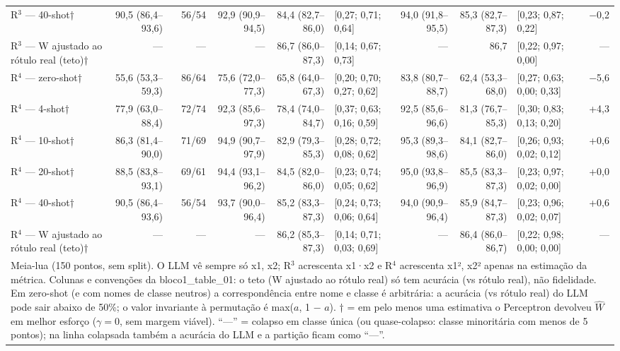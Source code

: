 \begin{table}[htbp]
\begin{tabular}{lrrrrlrrlr}
R$^3$ — 40-shot† & 90,5 (86,4–93,6) & 56/54 & 92,9 (90,9–94,5) & 84,4 (82,7–86,0) & [0,27; 0,71; 0,64] & 94,0 (91,8–95,5) & 85,3 (82,7–87,3) & [0,23; 0,87; 0,22] & $-$0,2 \\
R$^3$ — W ajustado ao rótulo real (teto)† & — & — & — & 86,7 (86,0–87,3) & [0,14; 0,67; 0,73] & — & 86,7 & [0,22; 0,97; 0,00] & — \\
\midrule
R$^4$ — zero-shot† & 55,6 (53,3–59,3) & 86/64 & 75,6 (72,0–77,3) & 65,8 (64,0–67,3) & [0,20; 0,70; 0,27; 0,62] & 83,8 (80,7–88,7) & 62,4 (53,3–68,0) & [0,27; 0,63; 0,00; 0,33] & $-$5,6 \\
R$^4$ — 4-shot† & 77,9 (63,0–88,4) & 72/74 & 92,3 (85,6–97,3) & 78,4 (74,0–84,7) & [0,37; 0,63; 0,16; 0,59] & 92,5 (85,6–96,6) & 81,3 (76,7–85,3) & [0,30; 0,83; 0,13; 0,20] & +4,3 \\
R$^4$ — 10-shot† & 86,3 (81,4–90,0) & 71/69 & 94,9 (90,7–97,9) & 82,9 (79,3–85,3) & [0,28; 0,72; 0,08; 0,62] & 95,3 (89,3–98,6) & 84,1 (82,7–86,0) & [0,26; 0,93; 0,02; 0,12] & +0,6 \\
R$^4$ — 20-shot† & 88,5 (83,8–93,1) & 69/61 & 94,4 (93,1–96,2) & 84,5 (82,0–86,0) & [0,23; 0,74; 0,05; 0,62] & 95,0 (93,8–96,9) & 85,5 (83,3–87,3) & [0,23; 0,97; 0,02; 0,00] & +0,0 \\
R$^4$ — 40-shot† & 90,5 (86,4–93,6) & 56/54 & 93,7 (90,0–96,4) & 85,2 (83,3–87,3) & [0,24; 0,73; 0,06; 0,64] & 94,0 (90,9–96,4) & 85,9 (84,7–87,3) & [0,23; 0,96; 0,02; 0,07] & +0,6 \\
R$^4$ — W ajustado ao rótulo real (teto)† & — & — & — & 86,2 (85,3–87,3) & [0,14; 0,71; 0,03; 0,69] & — & 86,4 (86,0–86,7) & [0,22; 0,98; 0,00; 0,00] & — \\
\bottomrule
\multicolumn{10}{p{0.95\linewidth}}{\footnotesize Meia-lua (150 pontos, sem split). O LLM vê sempre só x1, x2; R$^3$ acrescenta x1·x2 e R$^4$ acrescenta x1², x2² apenas na estimação da métrica. Colunas e convenções da bloco1\_table\_01: o teto (W ajustado ao rótulo real) só tem acurácia (vs rótulo real), não fidelidade. Em zero-shot (e com nomes de classe neutros) a correspondência entre nome e classe é arbitrária: a acurácia (vs rótulo real) do LLM pode sair abaixo de 50\%; o valor invariante à permutação é max($a$, 1 $-$ $a$). † = em pelo menos uma estimativa o Perceptron devolveu $\hat{W}$ em melhor esforço ($\gamma = 0$, sem margem viável). ``—'' = colapso em classe única (ou quase-colapso: classe minoritária com menos de 5 pontos); na linha colapsada também a acurácia do LLM e a partição ficam como ``—''.} \\
\end{tabular}
\end{table}
